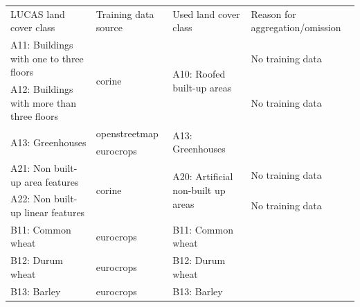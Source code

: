 \begin{table}[]
\label{tab:05_legend_harmonization}
\begin{tabular}{l{2cm}lll}
LUCAS land cover class                        & Training data source    & Used land cover class                                 & Reason for aggregation/omission                           \\
A11: Buildings with one to three floors       & \multirow{2}{*}{corine} & \multirow{2}{*}{A10: Roofed built-up areas}           & No training data                                          \\
A12: Buildings with more than three floors    &                         &                                                       & No training data                                          \\
\multirow{2}{*}{A13: Greenhouses}             & openstreetmap           & \multirow{2}{*}{A13: Greenhouses}                     &                                                           \\
                                              & eurocrops               &                                                       &                                                           \\
A21: Non built-up area features               & \multirow{2}{*}{corine} & \multirow{2}{*}{A20: Artificial non-built up areas}   & No training data                                          \\
A22: Non built-up linear features             &                         &                                                       & No training data                                          \\
B11: Common wheat                             & eurocrops               & B11: Common wheat                                     &                                                           \\
B12: Durum wheat                              & eurocrops               & B12: Durum wheat                                      &                                                           \\
B13: Barley                                   & eurocrops               & B13: Barley                                           &                                                           \\

\end{tabular}
\end{table}
